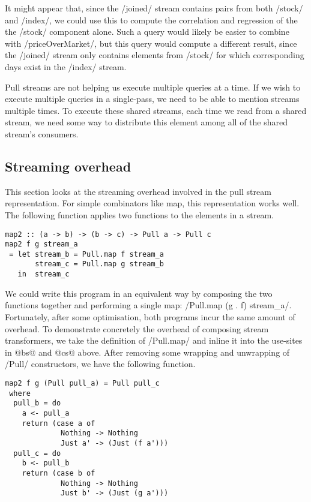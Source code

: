 It might appear that, since the \Hs/joined/ stream contains pairs from both \Hs/stock/ and \Hs/index/, we could use this to compute the correlation and regression of the the \Hs/stock/ component alone.
Such a query would likely be easier to combine with \Hs/priceOverMarket/, but this query would compute a different result, since the \Hs/joined/ stream only contains elements from \Hs/stock/ for which corresponding days exist in the \Hs/index/ stream.

Pull streams are not helping us execute multiple queries at a time.
If we wish to execute multiple queries in a single-pass, we need to be able to mention streams multiple times.
To execute these shared streams, each time we read from a shared stream, we need some way to distribute this element among all of the shared stream's consumers.

\subsection{Streaming overhead}
\label{taxonomy/pull/streaming-overhead}

This section looks at the streaming overhead involved in the pull stream representation.
For simple combinators like map, this representation works well.
The following function applies two functions to the elements in a stream.

\begin{lstlisting}
map2 :: (a -> b) -> (b -> c) -> Pull a -> Pull c
map2 f g stream_a
 = let stream_b = Pull.map f stream_a
       stream_c = Pull.map g stream_b
   in  stream_c
\end{lstlisting}

We could write this program in an equivalent way by composing the two functions together and performing a single map: \Hs/Pull.map (g . f) stream_a/.
Fortunately, after some optimisation, both programs incur the same amount of overhead.
To demonstrate concretely the overhead of composing stream transformers, we take the definition of \Hs/Pull.map/ and inline it into the use-sites in @bs@ and @cs@ above.
After removing some wrapping and unwrapping of \Hs/Pull/ constructors, we have the following function.

\begin{lstlisting}
map2 f g (Pull pull_a) = Pull pull_c
 where
  pull_b = do
    a <- pull_a
    return (case a of
             Nothing -> Nothing
             Just a' -> (Just (f a')))
  pull_c = do
    b <- pull_b
    return (case b of
             Nothing -> Nothing
             Just b' -> (Just (g a')))
\end{lstlisting}

